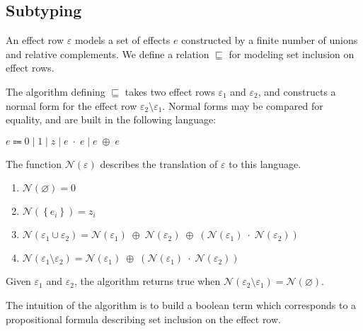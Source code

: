 \documentclass[12pt]{article}
\newcommand\parens[1]{\left( #1 \right)}
\newcommand\row{\varepsilon}
\newcommand\rEmpty{\varnothing}
\newcommand\rSingleton[1]{\left\{ #1 \right\}}
\newcommand\rUnion[2]{#1 \cup #2}
\newcommand\rDiff[2]{#1 \setminus #2}
\newcommand\brEmbed[1]{\mathcal{N}\parens{#1}}
\newcommand\brTerm{e}
\newcommand\brVar{z}
\newcommand\brZero{0}
\newcommand\brOne{1}
\newcommand\brAdd[2]{#1 \; \oplus \; #2}
\newcommand\brMul[2]{#1 \; \cdot \; #2}
\newcommand\effect{e}
\newcommand\subrowSym{\sqsubseteq}
\begin{document}
    \subsection{Subtyping}

      An effect row $\row$ models a set of effects $\effect$ constructed by a finite number of unions and relative complements. We define a relation $\subrowSym$ for modeling set inclusion on effect rows.

      The algorithm defining $\subrowSym$ takes two effect rows $\row_1$ and $\row_2$, and constructs a normal form for the effect row $\rDiff{\row_2}{\row_1}$. Normal forms may be compared for equality, and are built in the following language:

      \begin{center}
        $\brTerm \Coloneqq \brZero \mathrel{|} \brOne \mathrel{|} \brVar \mathrel{|} \brMul{\brTerm}{\brTerm} \mathrel{|} \brAdd{\brTerm}{\brTerm}$
      \end{center}

      The function $\brEmbed{\row}$ describes the translation of $\row$ to this language.

      \begin{enumerate}
        \item $\brEmbed{\rEmpty} = 0$
        \item $\brEmbed{\rSingleton{\effect_i}} = \brVar_i$
        \item $\brEmbed{\rUnion{\row_1}{\row_2}} = \brAdd{\brAdd{\brEmbed{\row_1}}{\brEmbed{\row_2}}}{\parens{\brMul{\brEmbed{\row_1}}{\brEmbed{\row_2}}}}$
        \item $\brEmbed{\rDiff{\row_1}{\row_2}} = \brAdd{\brEmbed{\row_1}}{\parens{\brMul{\brEmbed{\row_1}}{\brEmbed{\row_2}}}}$
      \end{enumerate}

      Given $\row_1$ and $\row_2$, the algorithm returns true when $\brEmbed{\rDiff{\row_2}{\row_1}} = \brEmbed{\rEmpty}$.

      The intuition of the algorithm is to build a boolean term which corresponds to a propositional formula describing set inclusion on the effect row.
\end{document}
